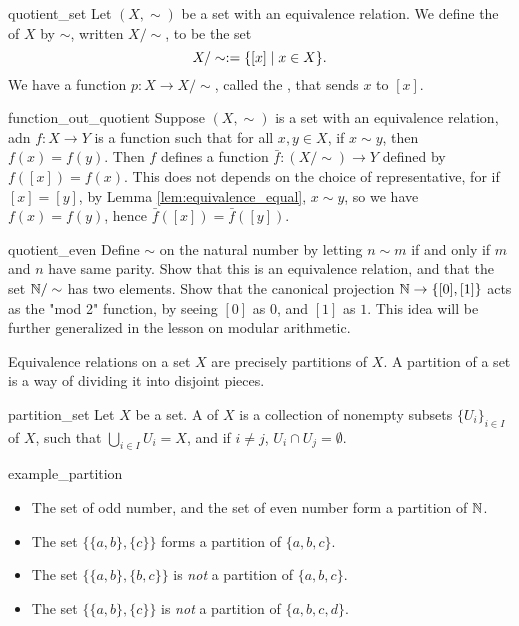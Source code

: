 \begin{cdef}{}{quotient_set}
    Let \( (X, \sim) \) be a set with an equivalence relation. We define the  of \( X \) by \( \sim \), written \( X/\sim \), to be the set
    \begin{equation*}
        X/\sim := \{ [x] \mid x \in X \}.
    \end{equation*}
    We have a function \( p : X \to X / \sim \), called the , that sends \( x \) to \( [x] \).
\end{cdef}

\begin{crem}{}{function_out_quotient}
    Suppose \( (X, \sim) \) is a set with an equivalence relation, adn \( f : X \to Y \) is a function such that for all \( x, y \in X \), if \( x \sim y \), then \( f(x) = f(y) \). Then \( f \) defines a function \( \bar f : (X / \sim) \to Y \) defined by \( f([x]) = f(x) \). This does not depends on the choice of representative, for if \( [x] = [y] \), by Lemma \ref{lem:equivalence_equal}, \( x \sim y \), so we have \( f(x) = f(y) \), hence \( \bar f([x]) = \bar f([y]) \). 
\end{crem}

\begin{cex}{}{quotient_even}
    Define \( \sim \) on the natural number by letting \( n \sim m \) if and only if \( m \) and \( n \) have same parity. Show that this is an equivalence relation, and that the set \( \mathbb{N} / \sim \) has two elements. Show that the canonical projection \( \mathbb{N} \to \{ [0], [1] \} \) acts as the "mod 2" function, by seeing \( [0] \) as \( 0 \), and \( [1] \) as \( 1 \). This idea will be further generalized in the lesson on modular arithmetic.
\end{cex}

Equivalence relations on a set \( X \) are precisely partitions of \( X \). A partition of a set is a way of dividing it into disjoint pieces.
\begin{cdef}{}{partition_set}
    Let \( X \) be a set. A  of \( X \) is a collection of nonempty subsets \( \{U_i\}_{i\in I} \) of \( X \), such that \( \bigcup_{i \in I} U_i = X  \), and if \( i \neq j \), \( U_i \cap U_j = \emptyset \). 
\end{cdef}

\begin{cexp}{}{example_partition}
    \begin{itemize}
        \item The set of odd number, and the set of even number form a partition of \( \mathbb{N} \). 
        \item The set \( \{ \{ a, b\}, \{ c \} \} \) forms a partition of \( \{ a, b, c \} \).
        \item The set \( \{ \{ a, b\}, \{ b, c \} \} \) is \textit{not} a partition of \( \{ a, b, c \} \).
        \item The set \( \{ \{ a, b\}, \{ c \} \} \) is \textit{not} a partition of \( \{ a, b, c, d \} \).
    \end{itemize}
\end{cexp}

